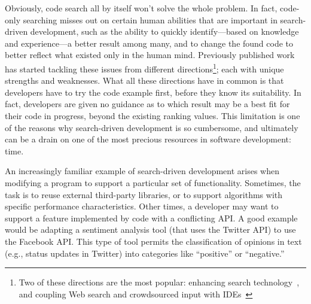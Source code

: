 Obviously, code search all by itself won't solve the whole problem. In fact, code-only searching misses out on certain human abilities that are important in search-driven development, such as the ability to quickly identify---based on knowledge and experience---a better result among many, and to change the found code to better reflect what existed only in the human mind. Previously published work has started tackling these issues from different directions\footnote{Two of these directions are the most popular: enhancing search technology~\cite{Bajracharya:2010um, Gysin:2010kt, McMillan:2011cm, McMillan:2012dj, Ying:2012tr}, and coupling Web search and crowdsourced input with IDEs~\cite{Bacchelli:2012dl, Brandt:2010tp, Hartmann:2010hx, Hoffmann:2007wo, Oney:2012ge, Wightman:2012gc}}; each with unique strengths and weaknesses. What all these directions have in common is that developers have to try the code example first, before they know its suitability. In fact, developers are given no guidance as to which result may be a best fit for their code in progress, beyond the existing ranking values. This limitation is one of the reasons why search-driven development is so cumbersome, and ultimately can be a drain on one of the most precious resources in software development: time. 


An increasingly familiar example of search-driven development arises when modifying a program to support a particular set of functionality. Sometimes, the task is to reuse external third-party libraries, or to support algorithms with specific performance characteristics. Other times, a developer may want to support a feature implemented by code with a conflicting API. A good example would be adapting a sentiment analysis tool (that uses the Twitter API) to use the Facebook API. This type of tool permits the classification of opinions in text (e.g., status updates in Twitter) into categories like ``positive'' or ``negative.'' 

